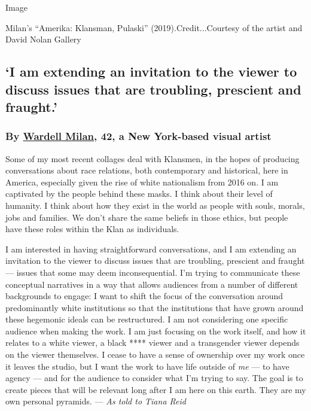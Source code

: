 Image

Milan's ``Amerika: Klansman, Pulaski'' (2019).Credit...Courtesy of the
artist and David Nolan Gallery

\hypertarget{i-am-extending-an-invitation-to-the-viewer-to-discuss-issues-that-are-troubling-prescient-and-fraught}{%
\subsection{`I am extending an invitation to the viewer to discuss
issues that are troubling, prescient and
fraught.'}\label{i-am-extending-an-invitation-to-the-viewer-to-discuss-issues-that-are-troubling-prescient-and-fraught}}

\hypertarget{by-wardell-milan-42-a-new-york-based-visual-artist}{%
\subsubsection{\texorpdfstring{\textbf{By}
\textbf{\href{https://wardellmilan.com/}{Wardell Milan}, 42, a New
York-based visual
artist}}{By Wardell Milan, 42, a New York-based visual artist}}\label{by-wardell-milan-42-a-new-york-based-visual-artist}}

Some of my most recent collages deal with Klansmen, in the hopes of
producing conversations about race relations, both contemporary and
historical, here in America, especially given the rise of white
nationalism from 2016 on. I am captivated by the people behind these
masks. I think about their level of humanity. I think about how they
exist in the world as people with souls, morals, jobs and families. We
don't share the same beliefs in those ethics, but people have these
roles within the Klan as individuals.

I am interested in having straightforward conversations, and I am
extending an invitation to the viewer to discuss issues that are
troubling, prescient and fraught --- issues that some may deem
inconsequential. I'm trying to communicate these conceptual narratives
in a way that allows audiences from a number of different backgrounds to
engage: I want to shift the focus of the conversation around
predominantly white institutions so that the institutions that have
grown around these hegemonic ideals can be restructured. I am not
considering one specific audience when making the work. I am just
focusing on the work itself, and how it relates to a white viewer, a
black **** viewer and a transgender viewer depends on the viewer
themselves. I cease to have a sense of ownership over my work once it
leaves the studio, but I want the work to have life outside of \emph{me}
--- to have agency --- and for the audience to consider what I'm trying
to say. The goal is to create pieces that will be relevant long after I
am here on this earth. They are my own personal pyramids. --- \emph{As
told to Tiana Reid}

